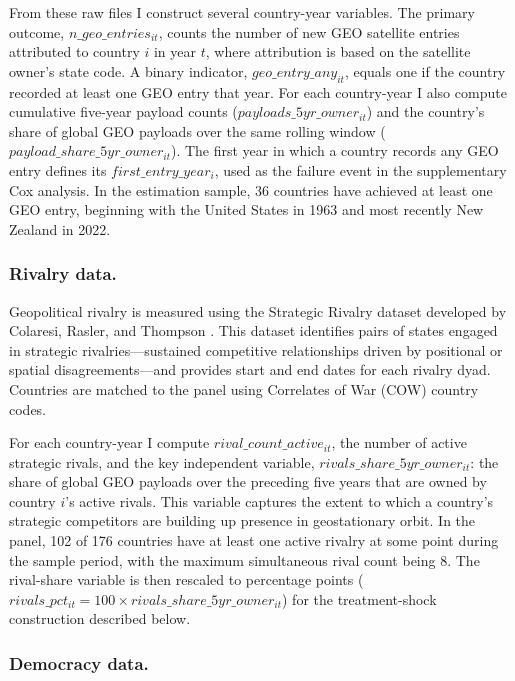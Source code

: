 \documentclass[11pt]{article}
\begin{document}
From these raw files I construct several country-year variables. The primary outcome, $n\_geo\_entries_{it}$, counts the number of new GEO satellite entries attributed to country $i$ in year $t$, where attribution is based on the satellite owner's state code. A binary indicator, $geo\_entry\_any_{it}$, equals one if the country recorded at least one GEO entry that year. For each country-year I also compute cumulative five-year payload counts ($payloads\_5yr\_owner_{it}$) and the country's share of global GEO payloads over the same rolling window ($payload\_share\_5yr\_owner_{it}$). The first year in which a country records any GEO entry defines its $first\_entry\_year_i$, used as the failure event in the supplementary Cox analysis. In the estimation sample, 36 countries have achieved at least one GEO entry, beginning with the United States in 1963 and most recently New Zealand in 2022.

\subsubsection{Rivalry data.}

Geopolitical rivalry is measured using the Strategic Rivalry dataset developed by Colaresi, Rasler, and Thompson \cite{colaresi2008}. This dataset identifies pairs of states engaged in strategic rivalries---sustained competitive relationships driven by positional or spatial disagreements---and provides start and end dates for each rivalry dyad. Countries are matched to the panel using Correlates of War (COW) country codes.

For each country-year I compute $rival\_count\_active_{it}$, the number of active strategic rivals, and the key independent variable, $rivals\_share\_5yr\_owner_{it}$: the share of global GEO payloads over the preceding five years that are owned by country $i$'s active rivals. This variable captures the extent to which a country's strategic competitors are building up presence in geostationary orbit. In the panel, 102 of 176 countries have at least one active rivalry at some point during the sample period, with the maximum simultaneous rival count being 8. The rival-share variable is then rescaled to percentage points ($rivals\_pct_{it} = 100 \times rivals\_share\_5yr\_owner_{it}$) for the treatment-shock construction described below.

\subsubsection{Democracy data.}
\end{document}
